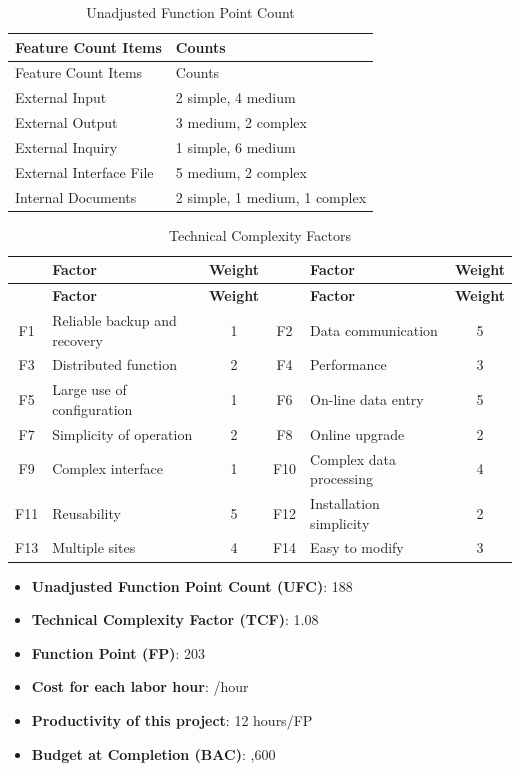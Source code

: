 \documentclass[12pt,a4paper]{article}
\newcommand{\yen}{\ifmmode\mbox{\textyen}\else\textyen\fi}
\begin{document}
\begin{longtable}{ll}
\caption{Unadjusted Function Point Count}\label{tab:ufp_count}\\
\toprule
Feature Count Items & Counts \\
\midrule
\endfirsthead
\toprule
Feature Count Items & Counts \\
\midrule
\endhead
External Input          & 2 simple, 4 medium \\
External Output         & 3 medium, 2 complex \\
External Inquiry        & 1 simple, 6 medium \\
External Interface File & 5 medium, 2 complex \\
Internal Documents      & 2 simple, 1 medium, 1 complex \\
\bottomrule
\end{longtable}

{\footnotesize
\begin{longtable}{@{}c >{\raggedright\arraybackslash}p{4.5cm} c c >{\raggedright\arraybackslash}p{4.5cm} c@{}}
\caption{Technical Complexity Factors}\label{tab:tcf}\\
\toprule
 & \textbf{Factor} & \textbf{Weight} & & \textbf{Factor} & \textbf{Weight} \\
\midrule
\endfirsthead
\toprule
 & \textbf{Factor} & \textbf{Weight} & & \textbf{Factor} & \textbf{Weight} \\
\midrule
\endhead
F1  & Reliable backup and recovery & 1 & F2  & Data communication      & 5 \\
F3  & Distributed function         & 2 & F4  & Performance             & 3 \\
F5  & Large use of configuration   & 1 & F6  & On-line data entry      & 5 \\
F7  & Simplicity of operation      & 2 & F8  & Online upgrade          & 2 \\
F9  & Complex interface            & 1 & F10 & Complex data processing & 4 \\
F11 & Reusability                  & 5 & F12 & Installation simplicity & 2 \\
F13 & Multiple sites               & 4 & F14 & Easy to modify          & 3 \\
\bottomrule
\end{longtable}
}

\begin{itemize}[leftmargin=*]
    \item \textbf{Unadjusted Function Point Count (UFC)}: 188
    \item \textbf{Technical Complexity Factor (TCF)}: 1.08
    \item \textbf{Function Point (FP)}: 203
    \item \textbf{Cost for each labor hour}: \yen100/hour
    \item \textbf{Productivity of this project}: 12 hours/FP
    \item \textbf{Budget at Completion (BAC)}: \yen243,600
\end{itemize}
\end{document}
